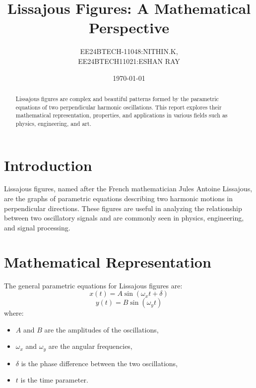 \documentclass{article}
\title{Lissajous Figures: A Mathematical Perspective}
\author{EE24BTECH-11048:NITHIN.K,\\EE24BTECH11021:ESHAN RAY}
\date{\today}
\begin{document}
\maketitle

\begin{abstract}
Lissajous figures are complex and beautiful patterns formed by the parametric equations of two perpendicular harmonic oscillations. This report explores their mathematical representation, properties, and applications in various fields such as physics, engineering, and art.
\end{abstract}

\section{Introduction}
Lissajous figures, named after the French mathematician Jules Antoine Lissajous, are the graphs of parametric equations describing two harmonic motions in perpendicular directions. These figures are useful in analyzing the relationship between two oscillatory signals and are commonly seen in physics, engineering, and signal processing.

\section{Mathematical Representation}
The general parametric equations for Lissajous figures are:
\begin{equation}
x(t) = A \sin(\omega_x t + \delta)
\end{equation}
\begin{equation}
y(t) = B \sin(\omega_y t)
\end{equation}
where:
\begin{itemize}
\item $A$ and $B$ are the amplitudes of the oscillations,
\item $\omega_x$ and $\omega_y$ are the angular frequencies,
\item $\delta$ is the phase difference between the two oscillations,
\item $t$ is the time parameter.
\end{itemize}
\end{document}
